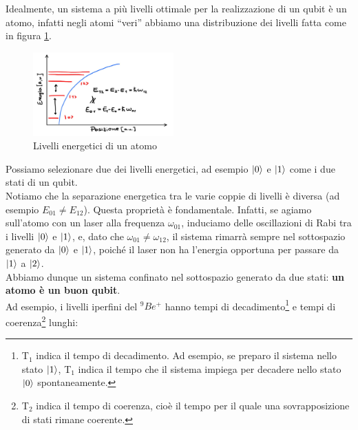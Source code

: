 \documentclass[10pt,a4paper]{article}
\begin{document}
Idealmente, un sistema a più livelli ottimale per la realizzazione di un qubit è un atomo, infatti negli atomi “veri” abbiamo una distribuzione dei livelli fatta come in figura \ref{nature atom}.


\begin{figure}
  \begin{center}
    \includegraphics[width=0.48\textwidth]{nature_atom.JPG}
  \end{center}
  \caption{Livelli energetici di un atomo \label{nature atom}}
\end{figure}


Possiamo selezionare due dei livelli energetici, ad esempio $\ket{0}$ e $\ket{1}$ come i due stati di un qubit.\\
Notiamo che la separazione energetica tra le varie coppie di livelli è diversa (ad esempio $E_{01} \neq E_{12}$).
Questa proprietà è fondamentale. Infatti, se agiamo sull'atomo con un laser alla frequenza $\omega_{01}$, induciamo delle oscillazioni di Rabi tra i livelli $\ket{0}$ e $\ket{1}$, e, dato che $\omega_{01} \neq \omega_{12}$, il sistema rimarrà sempre nel sottospazio generato da  $\ket{0}$ e $\ket{1}$, poiché il laser non ha l'energia opportuna per passare da $\ket{1}$ a $\ket{2}$.\\
Abbiamo dunque un sistema confinato nel sottospazio generato da due stati: \textbf{un atomo è un buon qubit}.\\
Ad esempio, i livelli iperfini del $^9Be^+$ hanno tempi di decadimento\footnote{T$_1$ indica il tempo di decadimento. Ad esempio, se preparo il sistema nello stato $\ket{1}$, T$_1$ indica il tempo che il sistema impiega per decadere nello stato $\ket{0}$ spontaneamente.} e tempi di coerenza\footnote{T$_2$ indica il tempo di coerenza, cioè il tempo per il quale una sovrapposizione di stati rimane coerente.} lunghi:
\end{document}

